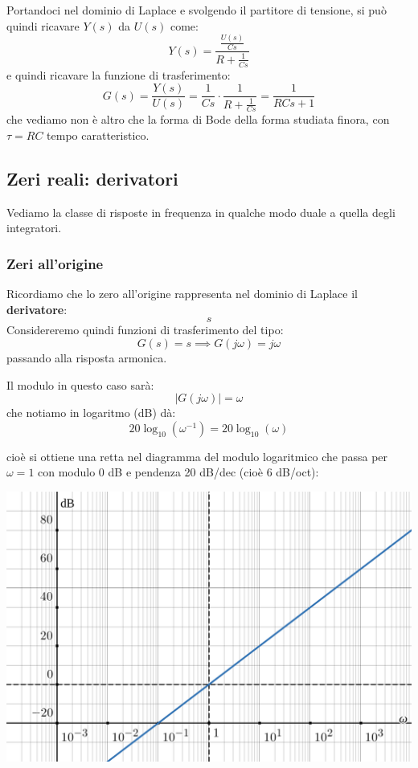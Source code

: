 \documentclass[a4paper,11pt]{article}
\begin{document}
Portandoci nel dominio di Laplace e svolgendo il partitore di tensione, si può quindi ricavare $Y(s)$ da $U(s)$ come:
$$
Y(s) = \frac{ \frac{U(s)}{Cs} }{ R + \frac{1}{Cs} }
$$
e quindi ricavare la funzione di trasferimento:
$$
G(s) = \frac{Y(s)}{U(s)} = \frac{1}{Cs} \cdot \frac{1}{R + \frac{1}{Cs}} = \frac{1}{RCs + 1}
$$
che vediamo non è altro che la forma di Bode della forma studiata finora, con $\tau = RC$ tempo caratteristico.

\subsection{Zeri reali: derivatori}
Vediamo la classe di risposte in frequenza in qualche modo duale a quella degli integratori.

\subsubsection{Zeri all'origine} 
Ricordiamo che lo zero all'origine rappresenta nel dominio di Laplace il \textbf{derivatore}:
$$
s
$$
Considereremo quindi funzioni di trasferimento del tipo:
$$
G(s) = s \implies G(j \omega) = j \omega
$$
passando alla risposta armonica.

Il modulo in questo caso sarà:
$$
|G(j \omega)| = \omega
$$
che notiamo in logaritmo (dB) dà:
$$
20 \log_{10} \left( \omega^{-1} \right) = 20 \log_{10} (\omega)
$$

\par\bigskip

\noindent
\begin{minipage}{\textwidth}
cioè si ottiene una retta nel diagramma del modulo logaritmico che passa per $\omega =1$ con modulo 0 dB e pendenza 20 dB/dec (cioè 6 dB/oct):
\begin{center}
	\includegraphics[scale=0.3]{../figures/differentiator_bode/mod.png}
\end{center}
\end{minipage}
\end{document}
